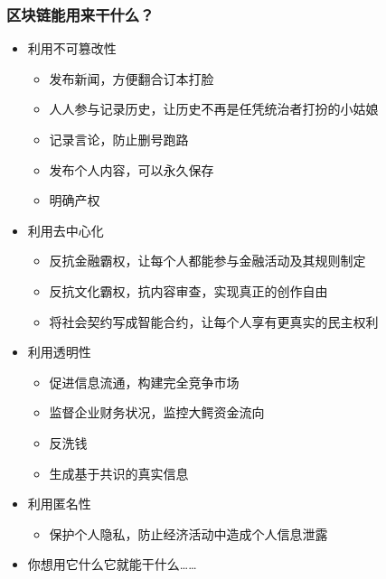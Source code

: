 \documentclass{beamer}
\begin{document}
\begin{frame}
    \frametitle{区块链能用来干什么？}

    \begin{itemize}
        \item 利用不可篡改性
            \begin{itemize}
                \item 发布新闻，方便翻合订本打脸
                \item 人人参与记录历史，让历史不再是任凭统治者打扮的小姑娘
                \item 记录言论，防止删号跑路
                \item 发布个人内容，可以永久保存
                \item 明确产权
            \end{itemize}
        \item 利用去中心化
            \begin{itemize}
                \item 反抗金融霸权，让每个人都能参与金融活动及其规则制定
                \item 反抗文化霸权，抗内容审查，实现真正的创作自由
                \item 将社会契约写成智能合约，让每个人享有更真实的民主权利
            \end{itemize}
        \item 利用透明性
            \begin{itemize}
                \item 促进信息流通，构建完全竞争市场
                \item 监督企业财务状况，监控大鳄资金流向
                \item 反洗钱
                \item 生成基于共识的真实信息
            \end{itemize}
        \item 利用匿名性
            \begin{itemize}
                \item 保护个人隐私，防止经济活动中造成个人信息泄露
            \end{itemize}
        \item 你想用它什么它就能干什么……
    \end{itemize}

\end{frame}
\end{document}

